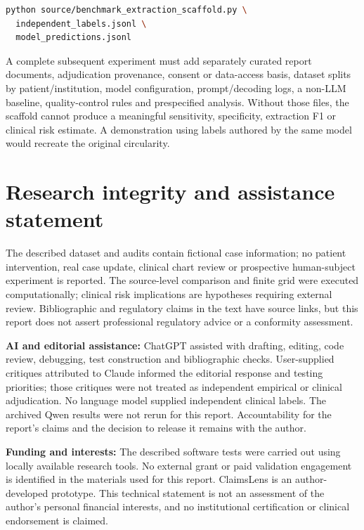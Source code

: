 \documentclass[11pt,twocolumn]{article}
\begin{document}
\begin{lstlisting}[language=bash]
python source/benchmark_extraction_scaffold.py \
  independent_labels.jsonl \
  model_predictions.jsonl
\end{lstlisting}

A complete subsequent experiment must add separately curated report documents, adjudication provenance, consent or data-access basis, dataset splits by patient/institution, model configuration, prompt/decoding logs, a non-LLM baseline, quality-control rules and prespecified analysis. Without those files, the scaffold cannot produce a meaningful sensitivity, specificity, extraction F1 or clinical risk estimate. A demonstration using labels authored by the same model would recreate the original circularity.

\section*{Research integrity and assistance statement}
The described dataset and audits contain fictional case information; no patient intervention, real case update, clinical chart review or prospective human-subject experiment is reported. The source-level comparison and finite grid were executed computationally; clinical risk implications are hypotheses requiring external review. Bibliographic and regulatory claims in the text have source links, but this report does not assert professional regulatory advice or a conformity assessment.

\textbf{AI and editorial assistance:} ChatGPT assisted with drafting, editing, code review, debugging, test construction and bibliographic checks. User-supplied critiques attributed to Claude informed the editorial response and testing priorities; those critiques were not treated as independent empirical or clinical adjudication. No language model supplied independent clinical labels. The archived Qwen results were not rerun for this report. Accountability for the report\textquoteright s claims and the decision to release it remains with the author.

\textbf{Funding and interests:} The described software tests were carried out using locally available research tools. No external grant or paid validation engagement is identified in the materials used for this report. \mbox{ClaimsLens} is an author-developed prototype. This technical statement is not an assessment of the author\textquoteright s personal financial interests, and no institutional certification or clinical endorsement is claimed.
\end{document}
